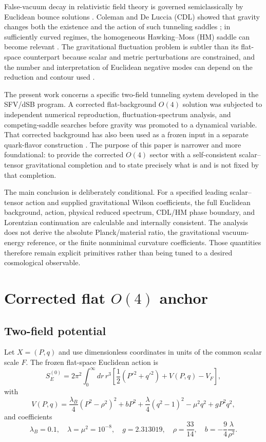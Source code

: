 \documentclass[11pt]{article}
\begin{document}
False-vacuum decay in relativistic field theory is governed semiclassically by Euclidean bounce solutions \cite{Coleman1977,CallanColeman1977}. Coleman and De Luccia (CDL) showed that gravity changes both the existence and the action of such tunneling saddles \cite{ColemanDeLuccia1980}; in sufficiently curved regimes, the homogeneous Hawking--Moss (HM) saddle can become relevant \cite{HawkingMoss1982}. The gravitational fluctuation problem is subtler than its flat-space counterpart because scalar and metric perturbations are constrained, and the number and interpretation of Euclidean negative modes can depend on the reduction and contour used \cite{LRT1985,TanakaSasaki1992,KLT2000,Lavrelashvili2006}.

The present work concerns a specific two-field tunneling system developed in the SFV/dSB program. A corrected flat-background $O(4)$ solution was subjected to independent numerical reproduction, fluctuation-spectrum analysis, and competing-saddle searches before gravity was promoted to a dynamical variable. That corrected background has also been used as a frozen input in a separate quark-flavor construction \cite{HoffmannPhaseB2}. The purpose of this paper is narrower and more foundational: to provide the corrected $O(4)$ sector with a self-consistent scalar--tensor gravitational completion and to state precisely what is and is not fixed by that completion.

The main conclusion is deliberately conditional. For a specified leading scalar--tensor action and supplied gravitational Wilson coefficients, the full Euclidean background, action, physical reduced spectrum, CDL/HM phase boundary, and Lorentzian continuation are calculable and internally consistent. The analysis does not derive the absolute Planck/material ratio, the gravitational vacuum-energy reference, or the finite nonminimal curvature coefficients. Those quantities therefore remain explicit primitives rather than being tuned to a desired cosmological observable.

\section{Corrected flat $O(4)$ anchor}

\subsection{Two-field potential}

Let $X=(P,q)$ and use dimensionless coordinates in units of the common scalar scale $F$. The frozen flat-space Euclidean action is
\begin{equation}
S_E^{(0)}=2\pi^2\int_0^\infty dr\,r^3\left[\frac12(P'^2+q'^2)+V(P,q)-V_F\right],
\end{equation}
with
\begin{equation}
V(P,q)=\frac{\lambda_B}{4}(P^2-\rho^2)^2+bP^2+\frac{\lambda}{4}(q^2-1)^2-\mu^2q^2+gP^2q^2,
\end{equation}
and coefficients
\begin{equation}
\lambda_B=0.1,\quad \lambda=\mu^2=10^{-8},\quad g=2.313019,\quad \rho=\frac{33}{14},\quad b=-\frac94\frac{\lambda}{\rho^2}.
\end{equation}
\end{document}
